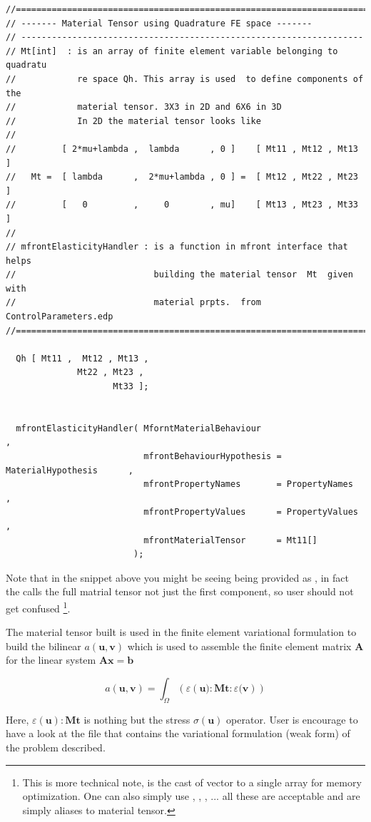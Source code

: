 \begin{lstlisting}[style=CppStyle]
//============================================================================
// ------- Material Tensor using Quadrature FE space -------
// -------------------------------------------------------------------
// Mt[int]  : is an array of finite element variable belonging to quadratu
//            re space Qh. This array is used  to define components of the
//            material tensor. 3X3 in 2D and 6X6 in 3D
//            In 2D the material tensor looks like
//
//         [ 2*mu+lambda ,  lambda      , 0 ]    [ Mt11 , Mt12 , Mt13 ]
//   Mt =  [ lambda      ,  2*mu+lambda , 0 ] =  [ Mt12 , Mt22 , Mt23 ]
//         [   0         ,     0        , mu]    [ Mt13 , Mt23 , Mt33 ]
//
// mfrontElasticityHandler : is a function in mfront interface that helps
//                           building the material tensor  Mt  given with
//                           material prpts.  from  ControlParameters.edp
//============================================================================

  Qh [ Mt11 ,  Mt12 , Mt13 ,
              Mt22 , Mt23 ,
                     Mt33 ];


  mfrontElasticityHandler( MforntMaterialBehaviour                             ,
                           mfrontBehaviourHypothesis = MaterialHypothesis      ,
                           mfrontPropertyNames       = PropertyNames           ,
                           mfrontPropertyValues      = PropertyValues          ,
                           mfrontMaterialTensor      = Mt11[]
                         );
\end{lstlisting}

Note that in the snippet above you might be seeing  being
provided as , in fact the  calls
the full matrial tensor not just the first component, so user should not
get confused
\footnote{This is more technical note,  is the cast of  vector to a single array for memory optimization. One can also simply use , , , ... all these are acceptable and are simply aliases to material tensor.}.

The material tensor  built is used in the finite element
variational formulation to build the bilinear
\(a(\mathbf{u},\mathbf{v})\) which is used to assemble the finite
element matrix \(\mathbf{A}\) for the linear system
\(\mathbf{Ax} = \mathbf{b}\)

\[
a(\mathbf{u},\mathbf{v}) = \int_{\Omega}(
                 \varepsilon \left(\mathbf{u}):\mathbf{Mt}:\varepsilon(\mathbf{v}\right)
               )
\]

Here, \(\varepsilon(\mathbf{u}):\mathbf{Mt}\) is nothing but the stress
\(\sigma(\mathbf{u})\) operator. User is encourage to have a look at the
 file that contains the variational
formulation (weak form) of the problem described.
